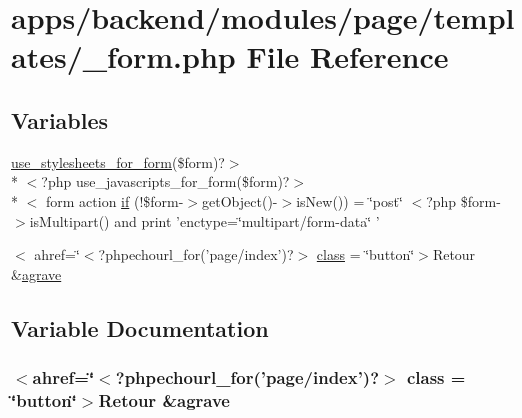 \hypertarget{backend_2modules_2page_2templates_2__form_8php}{\section{apps/backend/modules/page/templates/\-\_\-form.php File Reference}
\label{backend_2modules_2page_2templates_2__form_8php}
}
\subsection*{Variables}
\begin{DoxyCompactItemize}
\item 
\hyperlink{live_2modules_2user_2templates_2__form_8php_a86bc4522fdbe625b07bc4a4d6eec3df7}{use\-\_\-stylesheets\-\_\-for\-\_\-form}(\$form)?$>$\\*
$<$?php use\-\_\-javascripts\-\_\-for\-\_\-form(\$form)?$>$\\*
$<$ form action \hyperlink{backend_2modules_2page_2templates_2__form_8php_abd1acf0179bbb4a56e04d4fccdbc121f}{if} (!\$form-\/$>$get\-Object()-\/$>$is\-New()) = \char`\"{}post\char`\"{} $<$?php \$form-\/$>$is\-Multipart() and print 'enctype=\char`\"{}multipart/form-\/data\char`\"{} '
\item 
$<$ ahref=\char`\"{}$<$?phpechourl\-\_\-for('page/index')?$>$ \hyperlink{backend_2modules_2page_2templates_2__form_8php_a5448c8360efe064d3e8105ed8ce3719b}{class} = \char`\"{}button\char`\"{}$>$Retour \&\hyperlink{presse_2modules_2page_2templates_2concours_ouikos_success_8php_adcbedde811e3c81b65c252edf38caea2}{agrave}
\end{DoxyCompactItemize}


\subsection{Variable Documentation}
\hypertarget{backend_2modules_2page_2templates_2__form_8php_a5448c8360efe064d3e8105ed8ce3719b}{
\subsubsection[{class}]{\setlength{\rightskip}{0pt plus 5cm}$<$ahref=\char`\"{}$<$?phpechourl\-\_\-for('page/index')?$>$ class = \char`\"{}button\char`\"{}$>$Retour \&{\bf agrave}}}\label{backend_2modules_2page_2templates_2__form_8php_a5448c8360efe064d3e8105ed8ce3719b}


